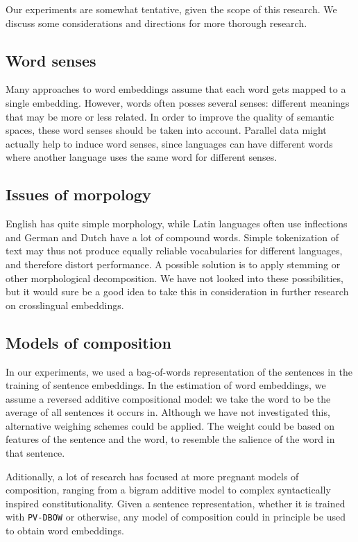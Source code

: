 
Our experiments are somewhat tentative, given the scope of this research. We discuss some considerations and directions for more thorough research.

\subsection{Word senses}
Many approaches to word embeddings assume that each word gets mapped to a single embedding. However, words often posses several senses: different meanings that may be more or less related. In order to improve the quality of semantic spaces, these word senses should be taken into account. Parallel data might actually help to induce word senses, since languages can have different words where another language uses the same word for different senses.

\subsection{Issues of morpology}
English has quite simple morphology, while Latin languages often use inflections and German and Dutch have a lot of compound words. Simple tokenization of text may thus not produce equally reliable vocabularies for different languages, and therefore distort performance. A possible solution is to apply stemming or other morphological decomposition. We have not looked into these possibilities, but it would sure be a good idea to take this in consideration in further research on crosslingual embeddings.

\subsection{Models of composition}
In our experiments, we used a bag-of-words representation of the sentences in the training of sentence embeddings. In the estimation of word embeddings, we assume a reversed additive compositional model: we take the word to be the average of all sentences it occurs in. Although we have not investigated this, alternative weighing schemes could be applied. The weight could be based on features of the sentence and the word, to resemble the salience of the word in that sentence.

Aditionally, a lot of research has focused at more pregnant models of composition, ranging from a bigram additive model \cite{hermann2014multilingual} to complex syntactically inspired constitutionality. Given a sentence representation, whether it is trained with {\tt PV-DBOW} or otherwise, any model of composition could in principle be used to obtain word embeddings.